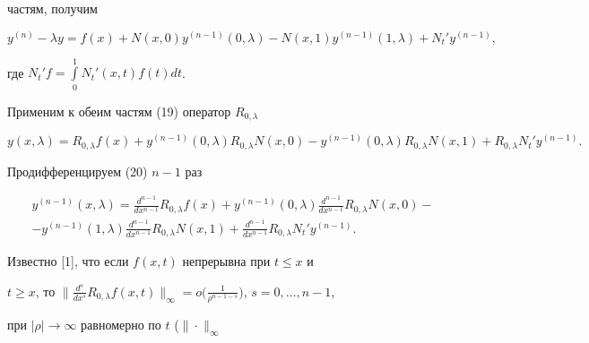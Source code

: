 частям, получим


\begin{equation}


y^{(n)}-\lambda y=f(x)+N(x,0)y^{(n-1)}(0,\lambda)-N(x,1)y^


{(n-1)}(1,\lambda)+N_t'y^{(n-1)},


\end{equation}


где $N_t'f=\int\limits_0^1N_t'(x,t)f(t)dt$.





Применим к обеим частям (19) оператор $R_{0,\lambda}$


\begin{equation}


y(x,\lambda)=R_{0,\lambda}f(x)+y^{(n-1)}(0,\lambda)R_{0,\lambda}


N(x,0)-y^{(n-1)}(0,\lambda)R_{0,\lambda}N(x,1)+R_{0,\lambda}


N_t'y^{(n-1)}.


\end{equation}





Продифференцируем (20) $n-1$ раз


\begin{multline}


y^{(n-1)}(x,\lambda)=\frac {d^{n-1}}{dx^{n-1}}R_{0,\lambda}


f(x)+y^{(n-1)}(0,\lambda)\frac {d^{n-1}}{dx^{n-1}}R_{0,\lambda}


N(x,0)- \\


%


-y^{(n-1)}(1,\lambda)\frac {d^{n-1}}{dx^{n-1}}R_


{0,\lambda}N(x,1)+\frac {d^{n-1}}{dx^{n-1}}R_{0,\lambda}N_t'


y^{(n-1)}.


\end{multline}





Известно [1], что если $f(x,t)$ непрерывна при $t\le x$ и


$t\ge x$, то $\big\| \frac {d^s}{dx^s}R_{0,\lambda}f(x,t)\big\|


_\infty=o\big( \frac 1{\rho^{n-1-s}}\big)$, $s=0,\dotsc,n-1$,


при $|\rho|\to\infty$ равномерно по $t$ ($\|\cdot\|_\infty$


